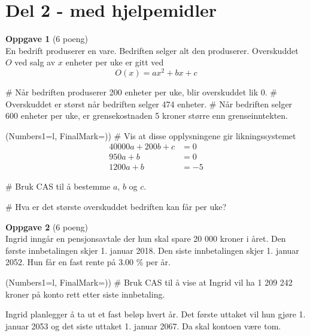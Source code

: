 \documentclass[12pt, a4paper]{article}
\begin{document}
\section*{Del 2 - med hjelpemidler}
\vspace*{2em}
{\bfseries \large Oppgave 1} (6 poeng) \vspace*{1em} \\
En bedrift produserer en vare.
Bedriften selger alt den produserer.
Overskuddet $O$ ved salg av $x$ enheter per uke er gitt ved
\begin{equation*}
	O(x) = ax^2 + bx + c
\end{equation*}
\begin{easylist}[itemize]
	# Når bedriften produserer 200 enheter per uke,
	blir overskuddet lik 0.
	# Overskuddet er størst når bedriften
	selger 474 enheter.
	# Når bedriften selger 600 enheter per uke,
	er grensekostnaden 5 kroner større enn grenseinntekten.
\end{easylist}
\begin{easylist}[enumerate]
	\ListProperties(Numbers1=l, FinalMark={)})
	# Vis at disse opplysningene gir likningssystemet
	\begin{align*}
	 40000a + 200b + c &= 0 \\
	 950 a + b &= 0 \\
	 1200a + b &= -5
	\end{align*}
	
	# Bruk CAS til å bestemme $a$, $b$ og $c$.
	
	# Hva er det største overskuddet bedriften
	kan får per uke?
\end{easylist}
\vfill
\vspace*{2em}
{\bfseries \large Oppgave 2} (6 poeng) \vspace*{1em} \\
Ingrid inngår en pensjonsavtale der hun skal spare 20 000
kroner i året. Den første innbetalingen skjer 1. januar 2018.
Den siste innbetalingen skjer 1. januar 2052.
Hun får en fast rente på 3.00 \% per år.
\begin{easylist}[enumerate]
	\ListProperties(Numbers1=l, FinalMark={)})
	# Bruk CAS til å vise at Ingrid vil ha
	1 209 242 kroner på konto rett etter
	siste innbetaling.
\end{easylist}
Ingrid planlegger å ta ut et fast beløp hvert år.
Det første uttaket vil hun gjøre 1. januar 2053 og
det siste uttaket 1. januar 2067. Da skal kontoen være tom.
\end{document}
